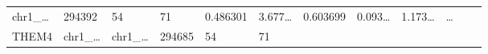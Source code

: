 \documentclass[
]{article}
\begin{document}
\begin{longtable}[]{@{}llllllllllll@{}}
\begin{minipage}[t]{0.06\columnwidth}
chr1\_\ldots{}\strut
\end{minipage} & \begin{minipage}[t]{0.06\columnwidth}\raggedright
294392\strut
\end{minipage} & \begin{minipage}[t]{0.06\columnwidth}\raggedright
54\strut
\end{minipage} & \begin{minipage}[t]{0.06\columnwidth}\raggedright
71\strut
\end{minipage} & \begin{minipage}[t]{0.06\columnwidth}\raggedright
0.486301\strut
\end{minipage} & \begin{minipage}[t]{0.08\columnwidth}\raggedright
3.677\ldots{}\strut
\end{minipage} & \begin{minipage}[t]{0.06\columnwidth}\raggedright
0.603699\strut
\end{minipage} & \begin{minipage}[t]{0.06\columnwidth}\raggedright
0.093\ldots{}\strut
\end{minipage} & \begin{minipage}[t]{0.09\columnwidth}\raggedright
1.173\ldots{}\strut
\end{minipage} & \begin{minipage}[t]{0.02\columnwidth}\raggedright
\ldots{}\strut
\end{minipage}\tabularnewline
\begin{minipage}[t]{0.06\columnwidth}\raggedright
THEM4\strut
\end{minipage} & \begin{minipage}[t]{0.06\columnwidth}\raggedright
chr1\_\ldots{}\strut
\end{minipage} & \begin{minipage}[t]{0.06\columnwidth}\raggedright
chr1\_\ldots{}\strut
\end{minipage} & \begin{minipage}[t]{0.06\columnwidth}\raggedright
294685\strut
\end{minipage} & \begin{minipage}[t]{0.06\columnwidth}\raggedright
54\strut
\end{minipage} & \begin{minipage}[t]{0.06\columnwidth}\raggedright
71\strut
\end{minipage} & \begin{minipage}[t]{0.06\columnwidth}\raggedright

\end{minipage}
\end{longtable}
\end{document}
